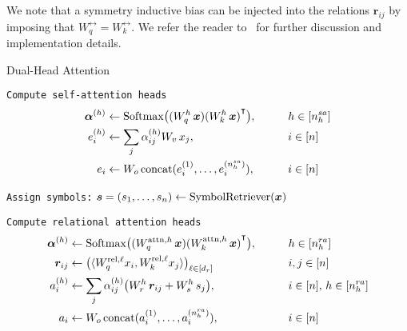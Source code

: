 We note that a symmetry inductive bias can be injected into the relations $\bm{r}_{ij}$ by imposing that $W_{q}^{\rel} = W_k^{\rel}$. We refer the reader to~ for further discussion and implementation details.


\begin{algorithm}[ht!]
	\caption{Dual-Head Attention}\label{alg:dual_head_attn}

    \vspace{1em}

    \texttt{Compute self-attention heads}
    \begin{align*}
        \bm{\alpha}^{(h)} &\gets \mathrm{Softmax}\big({(W_q^h\, \bm{x})} {(W_k^h\, \bm{x})}^\intercal\big), \qquad && h \in [n_h^{sa}] \\
        e_i^{(h)} &\gets \sum_{j} \alpha_{ij}^{(h)} W_v\, x_j, \qquad && i \in [n]\\
        e_i &\gets W_o \, \mathrm{concat}(e_i^{(1)}, \ldots, e_i^{(n_h^{sa})}), && i \in [n]
    \end{align*}

    \texttt{Assign symbols:} $\bm{s} = (s_1, \ldots, s_n) \gets \mathrm{SymbolRetriever}(\bm{x})$

    \texttt{Compute relational attention heads}
    \begin{align*}
        \bm{\alpha}^{(h)} &\gets \mathrm{Softmax}\big({(W_q^{\mathrm{attn},h}\, \bm{x})} {(W_k^{\mathrm{attn},h}\, \bm{x})}^\intercal\big), \qquad && h \in [n_h^{ra}] \\
        \bm{r}_{ij} &\gets \big(\langle W_q^{\mathrm{rel}, \ell} x_i, W_k^{\mathrm{rel},\ell} x_j \rangle\big)_{\ell \in [d_r]} \qquad && i,j \in [n] \\
        a_i^{(h)} &\gets \sum_{j} \alpha_{ij}^{(h)} \big(W_r^h \, \bm{r}_{ij} + W_s^{h}\, s_j\big), \qquad && i \in [n],\, h \in [n_h^{ra}]\\
        a_i &\gets W_o \, \mathrm{concat}(a_i^{(1)}, \ldots, a_i^{(n_h^{ra})}), && i \in [n]
    \end{align*}


\end{algorithm}

